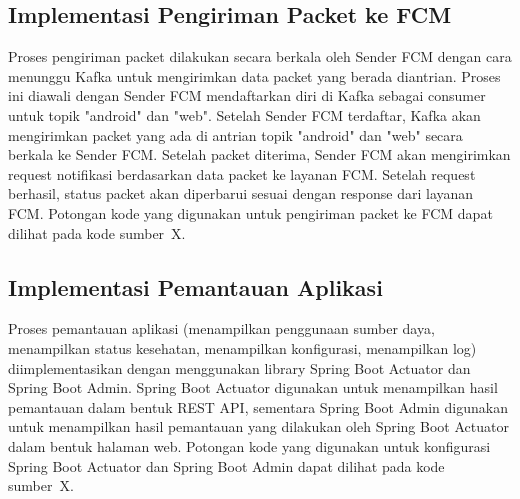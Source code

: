 \subsection{Implementasi Pengiriman Packet ke FCM}
\par Proses pengiriman packet dilakukan secara berkala oleh Sender FCM dengan cara menunggu Kafka untuk mengirimkan data packet yang berada diantrian. Proses ini diawali dengan Sender FCM mendaftarkan diri di Kafka sebagai consumer untuk topik "android" dan "web". Setelah Sender FCM terdaftar, Kafka akan mengirimkan packet yang ada di antrian topik "android" dan "web" secara berkala ke Sender FCM. Setelah packet diterima, Sender FCM akan mengirimkan request notifikasi berdasarkan data packet ke layanan FCM. Setelah request berhasil, status packet akan diperbarui sesuai dengan response dari layanan FCM. Potongan kode yang digunakan untuk pengiriman packet ke FCM dapat dilihat pada kode sumber~X.

\subsection{Implementasi Pemantauan Aplikasi}
\par Proses pemantauan aplikasi (menampilkan penggunaan sumber daya, menampilkan status kesehatan, menampilkan konfigurasi, menampilkan log) diimplementasikan dengan menggunakan library Spring Boot Actuator dan Spring Boot Admin. Spring Boot Actuator digunakan untuk menampilkan hasil pemantauan dalam bentuk REST API, sementara Spring Boot Admin digunakan untuk menampilkan hasil pemantauan yang dilakukan oleh Spring Boot Actuator dalam bentuk halaman web. Potongan kode yang digunakan untuk konfigurasi Spring Boot Actuator dan Spring Boot Admin dapat dilihat pada kode sumber~X.
